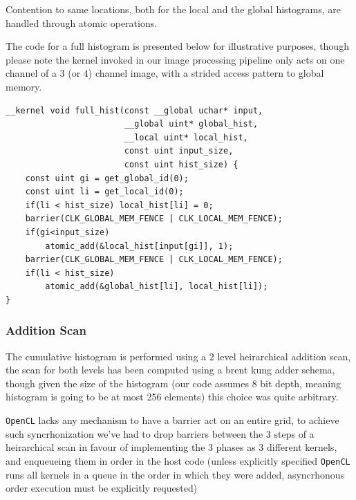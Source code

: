 \documentclass[11pt]{article}
\begin{document}
Contention to same locations, both for the local and the global histograms, are handled through atomic operations.

The code for a full histogram is presented below for illustrative purposes, though please note the kernel invoked in our image processing pipeline only acts on one channel of a 3 (or 4) channel image, with a strided access pattern to global memory. 
\begin{verbatim}
__kernel void full_hist(const __global uchar* input,
                        __global uint* global_hist,
                        __local uint* local_hist,
                        const uint input_size,
                        const uint hist_size) {
    const uint gi = get_global_id(0);
    const uint li = get_local_id(0);
    if(li < hist_size) local_hist[li] = 0;
    barrier(CLK_GLOBAL_MEM_FENCE | CLK_LOCAL_MEM_FENCE);
    if(gi<input_size)
        atomic_add(&local_hist[input[gi]], 1);
    barrier(CLK_GLOBAL_MEM_FENCE | CLK_LOCAL_MEM_FENCE);
    if(li < hist_size)
        atomic_add(&global_hist[li], local_hist[li]);
}
\end{verbatim}
\subsubsection{Addition Scan}
\label{sec:orgc5b760f}
The cumulative histogram is performed using a 2 level heirarchical addition scan, the scan for both levels has been computed using a brent kung adder schema, though given the size of the histogram (our code assumes 8 bit depth, meaning histogram is going to be at most 256 elements) this choice was quite arbitrary.

\texttt{OpenCL} lacks any mechanism to have a barrier act on an entire grid, to achieve such syncrhonization we've had to drop barriers between the 3 steps of a heirarchical scan in favour of implementing the 3 phases as 3 different kernels, and enqueueing them in order in the host code (unless explicitly specified \texttt{OpenCL} runs all kernels in a queue in the order in which they were added, asyncrhonous order execution must be explicitly requested)
\end{document}
